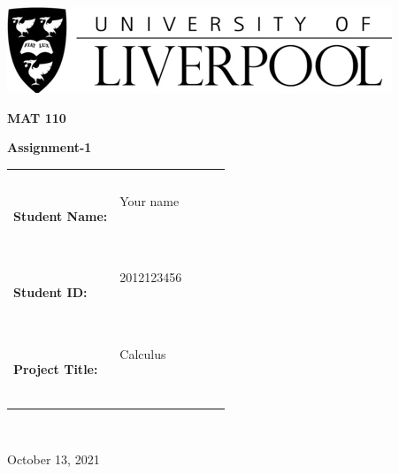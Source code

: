 \documentclass[12pt]{article}
\begin{document}
\begin{center}
  \includegraphics[scale=1]{uol-logo}
\end{center}

{\vspace{5em}}

\begin{center}
  \Huge{{\textbf{MAT 110}}}
\end{center}
\begin{center}
  \LARGE{{\textbf{Assignment-1}}}
\end{center}
{\vspace{7em}}

\begin{center}
  \begin{tabular}{|lp{6.0cm}lll|}
    \hline
    &  &  &  & \\
    &  &  &  & \\
    \textbf{\Large Student Name:} & \Large Your name
    
    \  &  &  & \\
    \textbf{\Large Student ID:} &  \Large 2012123456
    
    \  &  &  & \\
    \textbf{\Large Project Title:} &  \Large Calculus
    
    \  &  &  & \\
    \hline
  \end{tabular}
\end{center}

\



{\medskip}

\begin{center}
  October 13, 2021
\end{center}

{\newpage}


\setlength{\parindent}{0.0in}
\setlength{\parskip}{0.05in}

\newcommand\course{MAT 110}
\newcommand\hwnumber{1}                  %
\newcommand\StudentName{Lorem Ipsum}           %
\newcommand\StudentID{netid12038}           %
\end{document}
